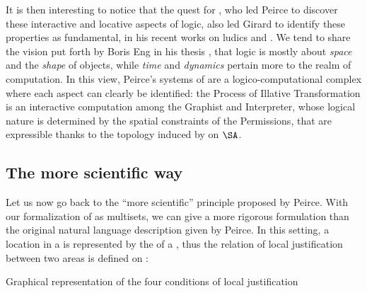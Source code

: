 \begin{scope}
\begin{scope}
It is then interesting to notice that the quest for , who led
Peirce to discover these interactive and locative aspects of logic, also led
Girard to identify these properties as fundamental, in his recent works on
ludics \cite{girard_locus_2001} and 
\cite{eng_exegesis_2023}. We tend to share the vision put forth by Boris Eng in
his thesis \cite[\S 24.4]{eng_exegesis_2023}, that logic is mostly about
\emph{space} and the \emph{shape} of objects, while \emph{time} and
\emph{dynamics} pertain more to the realm of computation. In this view, Peirce's
systems of  are a logico-computational complex where each aspect can clearly
be identified: the Process of Illative Transformation is an interactive
computation among the Graphist and Interpreter, whose logical nature is
determined by the spatial constraints of the Permissions, that are expressible
thanks to the topology induced by  on $\SA$.

\subsection{The more scientific way}

Let us now go back to the ``more scientific''  principle
proposed by Peirce. With our formalization of  as multisets, we can
give a more rigorous formulation than the original natural language description
given by Peirce. In this setting, a location in a  is
represented by the  of a , thus the relation of local
justification between two areas is defined on :

\begin{marginfigure}
  
  \caption{Graphical representation of the four conditions of local
  justification}
\end{marginfigure}


\end{scope}
\end{scope}
